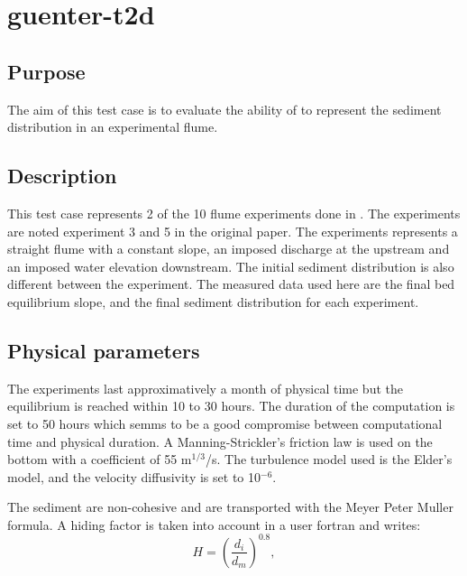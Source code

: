 \chapter{guenter-t2d}
%

%
\section{Purpose}
The aim of this test case is to evaluate the ability of \gaia{} to represent the sediment distribution in an experimental flume.

\section{Description}
This test case represents 2 of the 10 flume experiments done in \cite{gunter1971kritische}. The experiments are noted experiment 3 and 5 in the original paper. The experiments represents a straight flume with a constant slope, an imposed discharge at the upstream and an imposed water elevation downstream. The initial sediment distribution is also different between the experiment. The measured data used here are the final bed equilibrium slope, and the final sediment distribution for each experiment.

\section{Physical parameters}

The experiments last approximatively a month of physical time but the equilibrium is reached within 10 to 30 hours. The duration of the computation is set to 50 hours which semms to be a good compromise between computational time and physical duration. 
%
A Manning-Strickler's friction law is used on the bottom with a coefficient of 55 m$^{1/3}$/s.
%
The turbulence model used is the Elder's model, and the velocity diffusivity is set to 10$^{-6}$.

The sediment are non-cohesive and are transported with the Meyer Peter Muller formula. A hiding factor is taken into account in a user fortran and writes:
\begin{equation}
 H=\left(\dfrac{d_i}{d_m}\right)^{0.8},
\end{equation}

